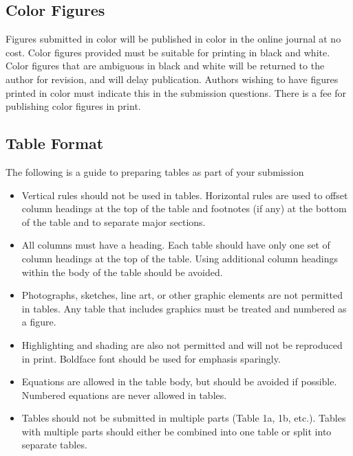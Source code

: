 \documentclass[NewProceedings, InsideFigs,LineNumbers]{asce-quarto}
\begin{document}
\subsection{Color Figures}\label{color-figures}

Figures submitted in color will be published in color in the online
journal at no cost. Color figures provided must be suitable for printing
in black and white. Color figures that are ambiguous in black and white
will be returned to the author for revision, and will delay publication.
Authors wishing to have figures printed in color must indicate this in
the submission questions. There is a fee for publishing color figures in
print.

\subsection{Table Format}\label{table-format}

The following is a guide to preparing tables as part of your submission

\begin{itemize}
\item
  Vertical rules should not be used in tables. Horizontal rules are used
  to offset column headings at the top of the table and footnotes (if
  any) at the bottom of the table and to separate major sections.
\item
  All columns must have a heading. Each table should have only one set
  of column headings at the top of the table. Using additional column
  headings within the body of the table should be avoided.
\item
  Photographs, sketches, line art, or other graphic elements are not
  permitted in tables. Any table that includes graphics must be treated
  and numbered as a figure.
\item
  Highlighting and shading are also not permitted and will not be
  reproduced in print. Boldface font should be used for emphasis
  sparingly.
\item
  Equations are allowed in the table body, but should be avoided if
  possible. Numbered equations are never allowed in tables.
\item
  Tables should not be submitted in multiple parts (Table 1a, 1b, etc.).
  Tables with multiple parts should either be combined into one table or
  split into separate tables.
\end{itemize}
\end{document}
